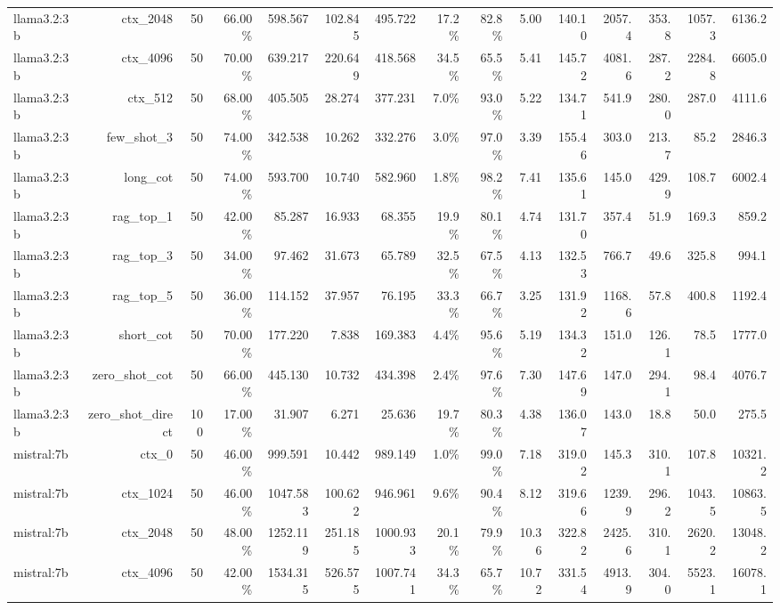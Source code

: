 \begin{table}[t]
\begin{tabular}{lrrrrrrrrrrrrrr}
llama3.2:3b & ctx\_2048 & 50 & 66.00\% & 598.567 & 102.845 & 495.722 & 17.2\% & 82.8\% & 5.00 & 140.10 & 2057.4 & 353.8 & 1057.3 & 6136.2 \\
llama3.2:3b & ctx\_4096 & 50 & 70.00\% & 639.217 & 220.649 & 418.568 & 34.5\% & 65.5\% & 5.41 & 145.72 & 4081.6 & 287.2 & 2284.8 & 6605.0 \\
llama3.2:3b & ctx\_512 & 50 & 68.00\% & 405.505 & 28.274 & 377.231 & 7.0\% & 93.0\% & 5.22 & 134.71 & 541.9 & 280.0 & 287.0 & 4111.6 \\
llama3.2:3b & few\_shot\_3 & 50 & 74.00\% & 342.538 & 10.262 & 332.276 & 3.0\% & 97.0\% & 3.39 & 155.46 & 303.0 & 213.7 & 85.2 & 2846.3 \\
llama3.2:3b & long\_cot & 50 & 74.00\% & 593.700 & 10.740 & 582.960 & 1.8\% & 98.2\% & 7.41 & 135.61 & 145.0 & 429.9 & 108.7 & 6002.4 \\
llama3.2:3b & rag\_top\_1 & 50 & 42.00\% & 85.287 & 16.933 & 68.355 & 19.9\% & 80.1\% & 4.74 & 131.70 & 357.4 & 51.9 & 169.3 & 859.2 \\
llama3.2:3b & rag\_top\_3 & 50 & 34.00\% & 97.462 & 31.673 & 65.789 & 32.5\% & 67.5\% & 4.13 & 132.53 & 766.7 & 49.6 & 325.8 & 994.1 \\
llama3.2:3b & rag\_top\_5 & 50 & 36.00\% & 114.152 & 37.957 & 76.195 & 33.3\% & 66.7\% & 3.25 & 131.92 & 1168.6 & 57.8 & 400.8 & 1192.4 \\
llama3.2:3b & short\_cot & 50 & 70.00\% & 177.220 & 7.838 & 169.383 & 4.4\% & 95.6\% & 5.19 & 134.32 & 151.0 & 126.1 & 78.5 & 1777.0 \\
llama3.2:3b & zero\_shot\_cot & 50 & 66.00\% & 445.130 & 10.732 & 434.398 & 2.4\% & 97.6\% & 7.30 & 147.69 & 147.0 & 294.1 & 98.4 & 4076.7 \\
llama3.2:3b & zero\_shot\_direct & 100 & 17.00\% & 31.907 & 6.271 & 25.636 & 19.7\% & 80.3\% & 4.38 & 136.07 & 143.0 & 18.8 & 50.0 & 275.5 \\
mistral:7b & ctx\_0 & 50 & 46.00\% & 999.591 & 10.442 & 989.149 & 1.0\% & 99.0\% & 7.18 & 319.02 & 145.3 & 310.1 & 107.8 & 10321.2 \\
mistral:7b & ctx\_1024 & 50 & 46.00\% & 1047.583 & 100.622 & 946.961 & 9.6\% & 90.4\% & 8.12 & 319.66 & 1239.9 & 296.2 & 1043.5 & 10863.5 \\
mistral:7b & ctx\_2048 & 50 & 48.00\% & 1252.119 & 251.185 & 1000.933 & 20.1\% & 79.9\% & 10.36 & 322.82 & 2425.6 & 310.1 & 2620.2 & 13048.2 \\
mistral:7b & ctx\_4096 & 50 & 42.00\% & 1534.315 & 526.575 & 1007.741 & 34.3\% & 65.7\% & 10.72 & 331.54 & 4913.9 & 304.0 & 5523.1 & 16078.1 \\

\end{tabular}
\end{table}
